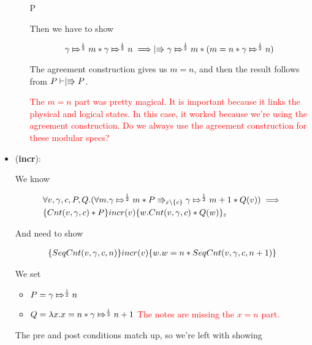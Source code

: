 \begin{itemize}
\begin{itemize}
\infrule
  {\vdash P \implies {}}
  {\vdash {}}
  
Then we have to show

\[
\apointsto{\gamma}{m}{\frac{1}{2}} * \apointsto{\gamma}{n}{\frac{1}{2}} \implies \upmod{ \apointsto{\gamma}{m}{\frac{1}{2}} * (m = n * \apointsto{\gamma}{n}{\frac{1}{2}})}
\]

The agreement construction gives us $m = n$, and then the result follows from $P \vdash \upmod{P}$.

\textcolor{red}{The $m = n$ part was pretty magical. It is important because it links the physical and logical states. In this case, it worked because we're using the agreement construction. Do we always use the agreement construction for these modular specs?}


\end{itemize}

\item (\textbf{incr}):

We know

\begin{align*}
& \forall v, \gamma, c, P, Q. (\forall m. \apointsto{\gamma}{m}{\frac{1}{2}} * P \Rrightarrow_{\varepsilon \backslash \{c\}} \apointsto{\gamma}{m + 1}{\frac{1}{2}} * Q(v)) \implies \\
& \hot{\Cnt{v}{\gamma}{c} * P}{incr(v)}{w. \Cnt{v}{\gamma}{c} * Q(w)}_{\varepsilon} 
\end{align*}

And need to show

\begin{align*}
\hot{\SCnt{v}{\gamma}{c}{n}}{incr(v)}{w. w = n * \SCnt{v}{\gamma}{c}{n + 1}}
\end{align*}

We set
\begin{itemize}

\item $P = \apointsto{\gamma}{n}{\frac{1}{2}}$

\item $Q = \lambda x. x = n * \apointsto{\gamma}{n + 1}{\frac{1}{2}}$ \textcolor{red}{The notes are missing the $x = n$ part.}

\end{itemize}

The pre and post conditions match up, so we're left with showing


\end{itemize}
